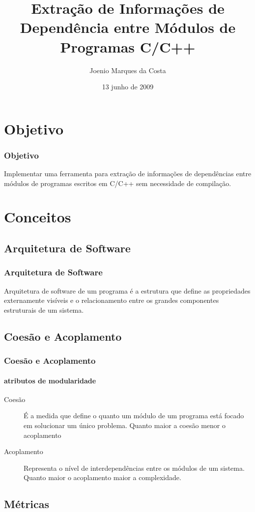 \documentclass{beamer}
\title[Universidade Católica do Salvador]{Extração de Informações de Dependência entre Módulos de Programas C/C++}
\author[Joenio Costa]{Joenio Marques da Costa}
\institute{UCSal - Universidade Católica do Salvador}
\date{13 junho de 2009}
\begin{document}
\frame{\titlepage} %

\begin{frame}
 \tableofcontents
\end{frame}

\section{Objetivo}

\begin{frame}
\frametitle{Objetivo}
 Implementar uma ferramenta para extração de informações de dependências
 entre módulos de programas escritos em C/C++ sem necessidade de compilação.
\end{frame}

\section{Conceitos}

\subsection{Arquitetura de Software}

\begin{frame}
\frametitle{Arquitetura de Software}
 Arquitetura de software de um programa é a estrutura que define as propriedades
 externamente visíveis e o relacionamento entre os grandes componentes
 estruturais de um sistema.
\end{frame}

\subsection{Coesão e Acoplamento}

\begin{frame}
\frametitle{Coesão e Acoplamento}
\framesubtitle{atributos de modularidade}
 \begin{description}
 \item[Coesão]É a medida que define o quanto um módulo de um programa está
 focado em solucionar um único problema. Quanto maior a coesão menor o
 acoplamento
 \item[Acoplamento]Representa o nível de interdependências entre os módulos de
 um sistema. Quanto maior o acoplamento maior a complexidade.
 \end{description}
\end{frame}

\subsection{Métricas}
\end{document}
